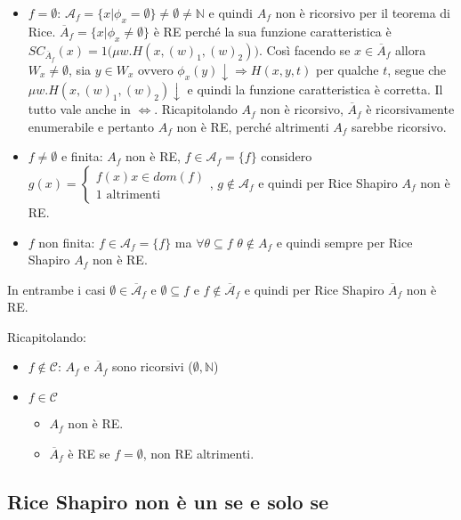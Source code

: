 \begin{itemize}
	\item $f = \emptyset$: $\mathcal{A}_f = \{ x | \phi_x = \emptyset \} \neq \emptyset \neq \mathbb{N}$ e quindi $A_f$ non è ricorsivo per il teorema di Rice. $\overline{A}_f = \{ x | \phi_x \neq \emptyset \}$ è RE perché la sua funzione caratteristica è $SC_{\overline{A}_f}(x) = 1\Big( \mu w. H(x, (w)_1, (w)_2) \Big)$. Così facendo se $x \in \overline{A}_f$ allora $W_x \neq \emptyset$, sia $y \in W_x$ ovvero $\phi_x(y) \downarrow \Rightarrow H(x,y,t) $ per qualche $t$, segue che $\mu w. H(x,(w)_1 , (w)_2) \downarrow$ e quindi la funzione caratteristica è corretta. Il tutto vale anche in $\Leftrightarrow $. Ricapitolando $A_f$ non è ricorsivo, $\overline{A}_f$ è ricorsivamente enumerabile e pertanto $A_f$ non è RE, perché altrimenti $A_f$ sarebbe ricorsivo.
	\item $f \neq \emptyset $ e finita:  $A_f$ non è RE, $f \in \mathcal{A}_f = \{ f \}$ considero $g(x) = \begin{cases}
	f(x) x \in dom(f) \\
	1 \text{ altrimenti}
	\end{cases}$, $g \notin \mathcal{A}_f$ e quindi per Rice Shapiro $A_f$ non è RE.
	\item $f$ non finita: $f \in \mathcal{A}_f = \{ f \}$ ma $\forall \theta \subseteq f$ $\theta \notin A_f$ e quindi sempre per Rice Shapiro $A_f$ non è RE.
\end{itemize} 

In entrambe i casi $\emptyset \in \overline{\mathcal{A}}_f $ e $\emptyset \subseteq f$ e $f \notin \overline{\mathcal{A}}_f$ e quindi per Rice Shapiro $\overline{A}_f$ non è RE.

Ricapitolando:
\begin{itemize}
	\item $f \notin \mathcal{C}$: $A_f$ e $\overline{A}_f$ sono ricorsivi ($\emptyset , \mathbb{N}$)
	\item $f \in \mathcal{C}$ \begin{itemize}
		\item $A_f$ non è RE.
		\item $\overline{A}_f$ è RE se $f = \emptyset$, non RE altrimenti.
	\end{itemize}
\end{itemize}

\subsection{Rice Shapiro non è un se e solo se}

